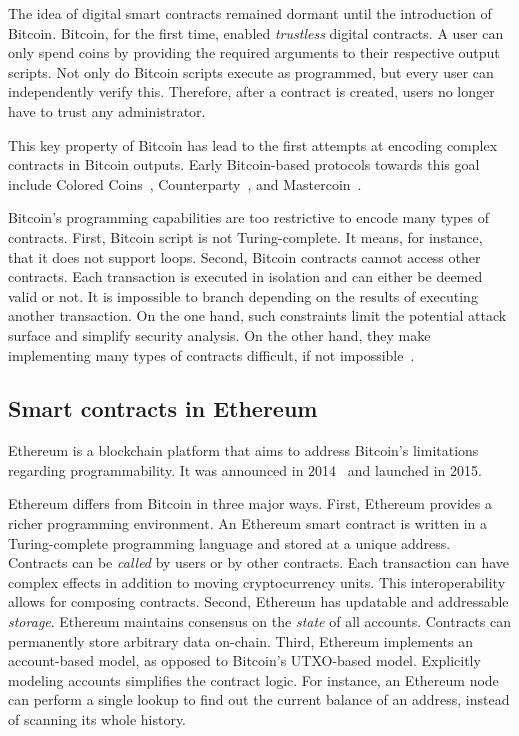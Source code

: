 The idea of digital smart contracts remained dormant until the introduction of Bitcoin.
Bitcoin, for the first time, enabled \textit{trustless} digital contracts.
A user can only spend coins by providing the required arguments to their respective output scripts.
Not only do Bitcoin scripts execute as programmed, but every user can independently verify this.
Therefore, after a contract is created, users no longer have to trust any administrator.

This key property of Bitcoin has lead to the first attempts at encoding complex contracts in Bitcoin outputs.
Early Bitcoin-based protocols towards this goal include Colored Coins~\cite{Rosenfeld2012}, Counterparty~\cite{Counterparty, Bartoletti2017a}, and Mastercoin~\cite{Willett2016}.

Bitcoin's programming capabilities are too restrictive to encode many types of contracts.
First, Bitcoin script is not Turing-complete.
It means, for instance, that it does not support loops.
Second, Bitcoin contracts cannot access other contracts.
Each transaction is executed in isolation and can either be deemed valid or not.
It is impossible to branch depending on the results of executing another transaction.
On the one hand, such constraints limit the potential attack surface and simplify security analysis.
On the other hand, they make implementing many types of contracts difficult, if not impossible~\cite{Miller2019}.


\subsection{Smart contracts in Ethereum}

Ethereum is a blockchain platform that aims to address Bitcoin's limitations regarding programmability.
It was announced in 2014~\cite{Buterin2014, Wood2014} and launched in 2015.

Ethereum differs from Bitcoin in three major ways.
First, Ethereum provides a richer programming environment.
An Ethereum smart contract is written in a Turing-complete programming language and stored at a unique address.
Contracts can be \textit{called} by users or by other contracts.
Each transaction can have complex effects in addition to moving cryptocurrency units.
This interoperability allows for composing contracts.
Second, Ethereum has updatable and addressable \textit{storage}.
Ethereum maintains consensus on the \textit{state} of all accounts.
Contracts can permanently store arbitrary data on-chain.
Third, Ethereum implements an account-based model, as opposed to Bitcoin's UTXO-based model.
Explicitly modeling accounts simplifies the contract logic.
For instance, an Ethereum node can perform a single lookup to find out the current balance of an address, instead of scanning its whole history.

